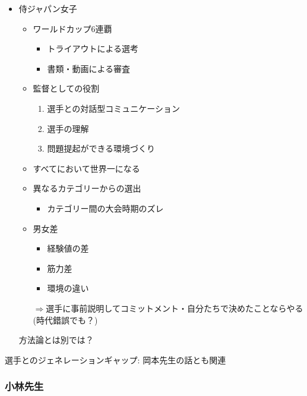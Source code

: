 \documentclass[dvipdfmx, 10.5pt]{jsarticle}
\begin{document}
\begin{itemize}
  \item 侍ジャパン女子
  \begin{itemize}
    \item ワールドカップ6連覇

    \begin{itemize}
      \item トライアウトによる選考

      \item 書類・動画による審査
    \end{itemize}

  \item 監督としての役割
  \begin{enumerate}
    \item 選手との対話型コミュニケーション

    \item 選手の理解

    \item 問題提起ができる環境づくり
  \end{enumerate}

  \item すべてにおいて世界一になる

  \item 異なるカテゴリーからの選出

  \begin{itemize}
    \item カテゴリー間の大会時期のズレ
  \end{itemize}

  \item 男女差

  \begin{itemize}
    \item 経験値の差

    \item 筋力差

    \item 環境の違い
  \end{itemize}

  $\Rightarrow$選手に事前説明してコミットメント・自分たちで決めたことならやる(時代錯誤でも？)
  \end{itemize}

  方法論とは別では？
\end{itemize}

選手とのジェネレーションギャップ: 岡本先生の話とも関連

\subsubsection{小林先生}
\end{document}
